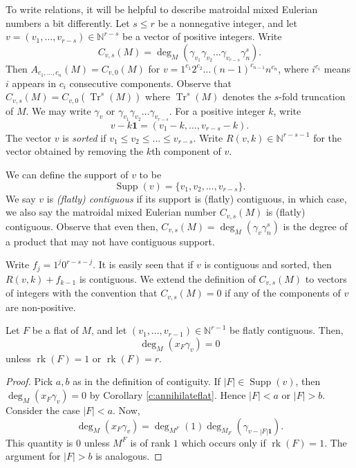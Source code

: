 \documentclass[ALCO,published]{cedram}
\numberwithin{equation}{section}
\numberwithin{figure}{section}
\newcommand{\N}{\mathbb{N}}
\DeclareMathOperator{\Supp}{Supp}
\DeclareMathOperator{\rk}{rk}
\begin{document}
To write relations, it will be helpful to describe matroidal mixed Eulerian numbers a bit  differently. Let $s\leq r$ be a nonnegative integer, and let $v=(v_1,\dots,v_{r-s})\in \N^{r-s}$ be a vector of positive integers.
Write 
\[C_{v,s}(M)=\deg_M(\gamma_{v_1}\gamma_{v_2}\dots\gamma_{v_{r-s}}\gamma_n^s).\]
Then $A_{c_1,\dots,c_n}(M)=C_{v,0}(M)$ for
$v=1^{c_1}2^{c_2}\dots (n-1)^{c_{n-1}}n^{c_n}$,
where $i^{c_i}$ means $i$ appears in $c_i$ consecutive components.
Observe that $C_{v,s}(M)=C_{v,0}(\operatorname{Tr}^s(M))$
where $\operatorname{Tr}^s(M)$ denotes the $s$-fold truncation of $M$.
We may write $\gamma_v$ or $\gamma_{v_1}\gamma_{v_2}\dots\gamma_{v_{r-s}}$.
For a positive integer $k$, write
\[v-k\mathbf{1}=(v_1-k,\dots,v_{r-s}-k).\]
The vector $v$ is {\em sorted} if $v_1\leq v_2\leq \dots\leq v_{r-s}$. Write $R(v,k)\in\N^{r-s-1}$ for the vector obtained by removing the $k$th component of $v$. 

We can define the support of $v$ to be 
\[\Supp(v)=\{v_1,v_2,\dots,v_{r-s}\}.\]
 We say $v$ is {\em (flatly) contiguous} if its support is (flatly) contiguous, in which case, we also say the matroidal mixed Eulerian number $C_{v,s}(M)$ is (flatly) contiguous. Observe that even then, $C_{v,s}(M)=\deg_M(\gamma_v\gamma_n^s)$ is the degree of a product that may not have contiguous support.
 
 
 
Write $f_j=1^{j}0^{r-s-j}$.
It is easily seen that if $v$ is contiguous and sorted, then $R(v,k)+f_{k-1}$ is contiguous. We extend the definition of $C_{v,s}(M)$ to vectors of integers with the convention that $C_{v,s}(M)=0$ if any of the components of $v$ are non-positive.


\begin{lemma} \label{l:contiguousvanishing}
    Let $F$ be a flat of $M$, and let $(v_1,\dots,v_{r-1})\in\N^{r-1}$ be flatly contiguous. 
    Then,
    \[\deg_M(x_F\gamma_v)=0\]
    unless $\rk(F)=1$ or $\rk(F)=r$.
\end{lemma}

\begin{proof}
  Pick $a, b$ as in the definition of contiguity. If $|F|\in \Supp(v)$, then $\deg_M(x_F\gamma_v)=0$ by Corollary \ref{c:annihilateflat}. Hence $|F|<a$ or $|F|>b$. Consider the case $|F|<a$. Now,
  \[\deg_M(x_F\gamma_v)=\deg_{M^F}(1)\deg_{M_F}(\gamma_{v-|F|\mathbf{1}}).\]
  This quantity is $0$ unless $M^F$ is of rank $1$ which occurs only if $\rk(F)=1$.
  The argument for $|F|>b$ is analogous.
\end{proof}
\end{document}
